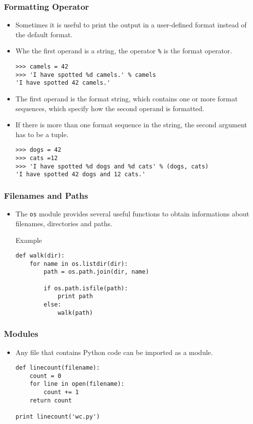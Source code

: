 \documentclass[handout]{beamer}
\newcommand{\beforeverb}{\footnotesize}
\newcommand{\afterverb}{\normalsize}
\begin{document}
\begin{frame}[fragile]
\frametitle{Formatting Operator}
\begin{itemize}
\item Sometimes it is useful to print the output in a user-defined format instead of the default format. 
\item Whe the first operand is a string, the operator \verb!%!  is the \alert{format operator}. 
\beforeverb
\begin{verbatim}
>>> camels = 42
>>> 'I have spotted %d camels.' % camels
'I have spotted 42 camels.'
\end{verbatim}
\afterverb

\item The first operand is the \alert{format string}, which contains one or more \alert{format sequences}, which
specify how the second operand is formatted.  
\item If there is more than one format sequence in the string,
the second argument has to be a \alert{tuple}. 
\beforeverb
\begin{verbatim}
>>> dogs = 42
>>> cats =12
>>> 'I have spotted %d dogs and %d cats' % (dogs, cats)
'I have spotted 42 dogs and 12 cats.'
\end{verbatim}
\afterverb

\end{itemize}
\end{frame}

\begin{frame}[fragile]
\frametitle{Filenames and Paths}
\begin{itemize}
\item The {\tt  os} module provides several useful functions to obtain informations about filenames, directories and paths. 
\begin{block}{Example}

\beforeverb
\begin{verbatim}
def walk(dir):
    for name in os.listdir(dir):
        path = os.path.join(dir, name)

        if os.path.isfile(path):
            print path
        else:
            walk(path)
\end{verbatim}
\end{block}
\end{itemize}
\end{frame}


\begin{frame}[fragile]
\frametitle{Modules}
\begin{itemize}
\item  Any file that contains Python code can be imported as a module.


\beforeverb
\begin{verbatim}
def linecount(filename):
    count = 0
    for line in open(filename):
        count += 1
    return count

print linecount('wc.py')
\end{verbatim}
\afterverb
\end{itemize}
\end{frame}
\end{document}
